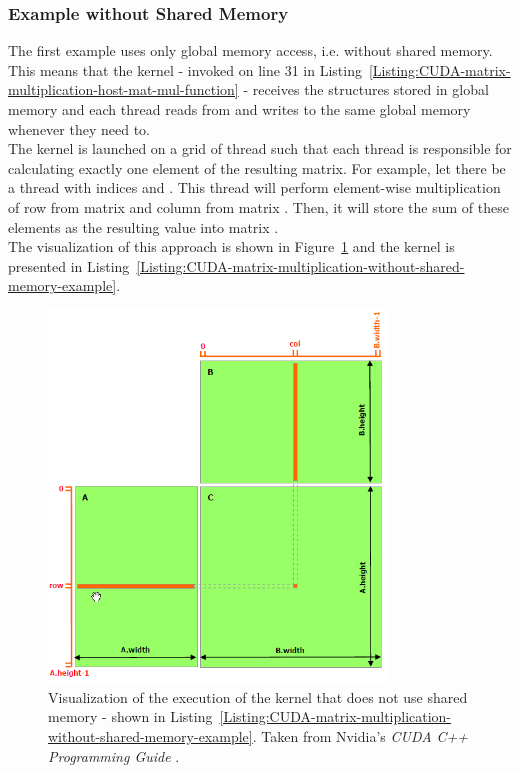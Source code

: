 \subsubsection{Example without Shared Memory}
The first example uses only global memory access, i.e. without shared memory. This means that the kernel - invoked on line 31 in Listing~\ref{Listing:CUDA-matrix-multiplication-host-mat-mul-function} - receives the  structures stored in global memory and each thread reads from and writes to the same global memory whenever they need to. \\
The kernel is launched on a grid of thread such that each thread is responsible for calculating exactly one element of the resulting  matrix. For example, let there be a thread with indices  and . This thread will perform element-wise multiplication of row  from matrix  and column  from matrix . Then, it will store the sum of these elements as the resulting value  into matrix . \\
The visualization of this approach is shown in Figure~\ref{Figure:CUDA-matrix-multiplication-without-shared-memory-example} and the kernel is presented in Listing~\ref{Listing:CUDA-matrix-multiplication-without-shared-memory-example}.

\begin{figure}[h!]
	\centering
	\includegraphics[width=0.8\textwidth, keepaspectratio]{images/ch1/CUDA-matrix-multiplication-without-shared-memory.png}
	\caption{Visualization of the execution of the kernel that does not use shared memory - shown in Listing~\ref{Listing:CUDA-matrix-multiplication-without-shared-memory-example}. Taken from Nvidia's \emph{CUDA C++ Programming Guide} \cite{NVIDIAMay2022}.}
	\label{Figure:CUDA-matrix-multiplication-without-shared-memory-example}
\end{figure}

